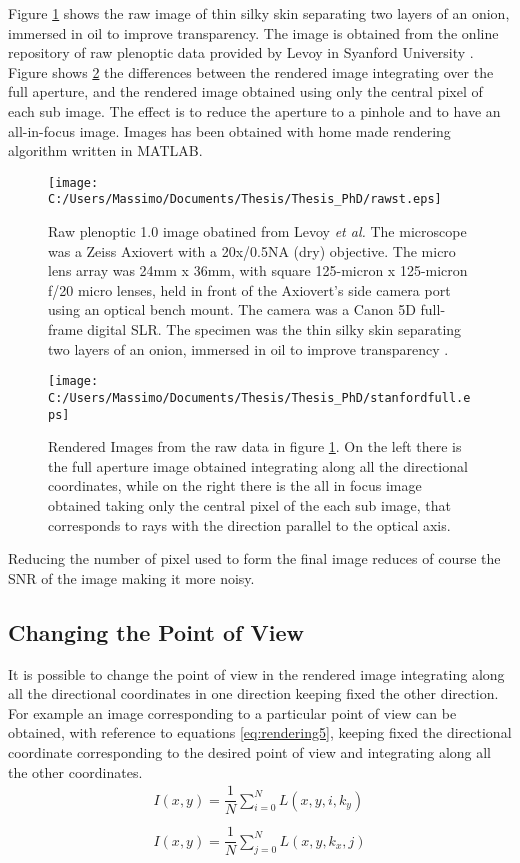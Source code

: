 Figure \ref{fig:rawstanford1} shows the raw image of thin silky skin separating two layers of an onion, immersed in oil to improve transparency. The image is obtained from the online repository of raw plenoptic data provided by Levoy in Syanford University \cite{levoy2006microscope}. 
 Figure shows \ref{fig:stanford1} the differences between the rendered image integrating over the full aperture, and the rendered image obtained using only the central pixel of each sub image. The effect is to reduce the aperture to a pinhole and to have an all-in-focus image.
 Images has been obtained with home made rendering algorithm written in MATLAB.
 \begin{figure}[H]
 	\centering
 	\texttt{[image: C:/Users/Massimo/Documents/Thesis/Thesis\_PhD/rawst.eps]}
 	\caption{\label{fig:rawstanford1} Raw plenoptic 1.0 image obatined from Levoy \textit{et al.} The microscope was a Zeiss Axiovert with a 20x/0.5NA (dry) objective. The micro lens array was 24mm x 36mm, with square 125-micron x 125-micron f/20 micro lenses, held in front of the Axiovert's side camera port using an optical bench mount. The camera was a Canon 5D full-frame digital SLR. The specimen was the thin silky skin separating two layers of an onion, immersed in oil to improve transparency \cite{levoy2006microscope}. }
 \end{figure}
\begin{figure}[H]
	\centering
	\texttt{[image: C:/Users/Massimo/Documents/Thesis/Thesis\_PhD/stanfordfull.eps]}
	\caption{\label{fig:stanford1}Rendered Images from the raw data in figure \ref{fig:rawstanford1}. On the left there is the full aperture image obtained integrating along all the directional coordinates, while on the right there is the all in focus image obtained taking only the central pixel of the each sub image, that corresponds to rays with the direction parallel to the optical axis.}
\end{figure}
Reducing the number of pixel used to form the final image reduces of course the SNR of the image making it more noisy.
 \subsection{Changing the Point of View}
It is possible to change the point of view in the rendered image integrating along all the directional coordinates in one direction keeping fixed the other direction. For example an image corresponding to a particular point of view can be obtained, with reference to equations \ref{eq:rendering5}, keeping fixed the directional coordinate corresponding to the desired point of view and integrating along all the other coordinates. 
 \begin{equation}
 \label{eq:rendering5}
 \begin{matrix}
 I(x,y)=\dfrac{1}{N}\sum_{i=0}^{N} L(x,y,i,k_y) \\
 \\
 I(x,y)=\dfrac{1}{N}\sum_{j=0}^{N} L(x,y,k_x,j)
 \end{matrix} 
 \end{equation}
